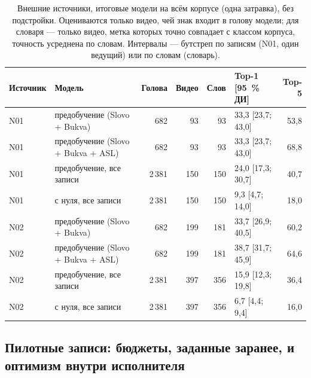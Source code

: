 \documentclass[a4paper,fleqn]{cas-dc}
\begin{document}
\begin{table}[t]
\caption{Внешние источники, итоговые модели на всём корпусе (одна затравка), без подстройки. Оцениваются только видео, чей знак входит в голову модели; для словаря — только видео, метка которых точно совпадает с классом корпуса, точность усреднена по словам. Интервалы — бутстреп по записям (N01, один ведущий) или по словам (словарь).}\label{tab:external}
\footnotesize
\centering
\begin{tabular}{llrrrlr}
\toprule
\textbf{Источник} & \textbf{Модель} & \textbf{Голова} & \textbf{Видео} & \textbf{Слов} & \textbf{Top-1 [95~\% ДИ]} & \textbf{Top-5} \\
\midrule
N01 & предобучение (Slovo + Bukva) & 682 & 93 & 93 & 33,3 [23,7; 43,0] & 53,8 \\
N01 & предобучение (Slovo + Bukva + ASL) & 682 & 93 & 93 & 33,3 [23,7; 43,0] & 68,8 \\
N01 & предобучение, все записи & 2\,381 & 150 & 150 & 24,0 [17,3; 30,7] & 40,7 \\
N01 & с нуля, все записи & 2\,381 & 150 & 150 & 9,3 [4,7; 14,0] & 18,0 \\
N02 & предобучение (Slovo + Bukva) & 682 & 199 & 181 & 33,7 [26,9; 40,5] & 60,2 \\
N02 & предобучение (Slovo + Bukva + ASL) & 682 & 199 & 181 & 38,7 [31,7; 45,9] & 64,6 \\
N02 & предобучение, все записи & 2\,381 & 397 & 356 & 15,9 [12,3; 19,8] & 36,4 \\
N02 & с нуля, все записи & 2\,381 & 397 & 356 & 6,7 [4,4; 9,4] & 16,0 \\
\bottomrule
\end{tabular}
\end{table}

\hypertarget{ux43fux438ux43bux43eux442ux43dux44bux435-ux437ux430ux43fux438ux441ux438-ux431ux44eux434ux436ux435ux442ux44b-ux437ux430ux434ux430ux43dux43dux44bux435-ux437ux430ux440ux430ux43dux435ux435-ux438-ux43eux43fux442ux438ux43cux438ux437ux43c-ux432ux43dux443ux442ux440ux438-ux438ux441ux43fux43eux43bux43dux438ux442ux435ux43bux44f}{%
\subsection{Пилотные записи: бюджеты, заданные заранее, и оптимизм внутри исполнителя}\label{ux43fux438ux43bux43eux442ux43dux44bux435-ux437ux430ux43fux438ux441ux438-ux431ux44eux434ux436ux435ux442ux44b-ux437ux430ux434ux430ux43dux43dux44bux435-ux437ux430ux440ux430ux43dux435ux435-ux438-ux43eux43fux442ux438ux43cux438ux437ux43c-ux432ux43dux443ux442ux440ux438-ux438ux441ux43fux43eux43bux43dux438ux442ux435ux43bux44f}}
\end{document}

